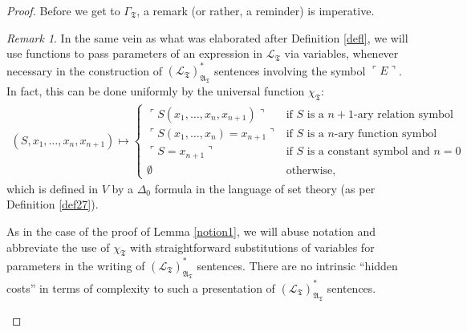\documentclass[12pt, twoside]{memoir}
\numberwithin{equation}{section}
\theoremstyle{definition}
\theoremstyle{remark}
\newtheorem{rem}[thm]{Remark}
\theoremstyle{definition}
\theoremstyle{definition}
\theoremstyle{definition}
\theoremstyle{remark}
\begin{document}
\begin{proof}
Before we get to $\Gamma_{\mathfrak{T}}$, a remark (or rather, a reminder) is imperative.

\begin{rem}\label{subsafe2}
In the same vein as what was elaborated after Definition \ref{defl}, we will use functions to pass parameters of an expression in $\mathcal{L}_{\mathfrak{T}}$ via variables, whenever necessary in the construction of $({\mathcal{L}_{\mathfrak{T}}})^*_{\mathfrak{A}_{\mathfrak{T}}}$ sentences involving the symbol $\ulcorner E \urcorner$. In fact, this can be done uniformly by the universal function $\chi_{\mathfrak{T}}$: 
\begin{align*}
    (S, x_1, \dots, x_n, x_{n+1}) \mapsto 
    \begin{cases}
        \ulcorner S(x_1, \dots, x_n, x_{n+1}) \urcorner & \text{if } S \text{ is a } n+1 \text{-ary relation symbol} \\
        \ulcorner S(x_1, \dots, x_n) = x_{n+1} \urcorner & \text{if } S \text{ is a } n \text{-ary function symbol }\\
        \ulcorner S = x_{n+1} \urcorner & \text{if } S \text{ is a } \text{constant symbol and } n = 0 \\
        \emptyset & \text{otherwise},
    \end{cases}
\end{align*}
which is defined in $V$ by a $\Delta_0$ formula in the language of set theory (as per Definition \ref{def27}).

As in the case of the proof of Lemma \ref{notion1}, we will abuse notation and abbreviate the use of $\chi_{\mathfrak{T}}$ with straightforward substitutions of variables for parameters in the writing of $({\mathcal{L}_{\mathfrak{T}}})^*_{\mathfrak{A}_{\mathfrak{T}}}$ sentences. There are no intrinsic ``hidden costs'' in terms of complexity to such a presentation of $({\mathcal{L}_{\mathfrak{T}}})^*_{\mathfrak{A}_{\mathfrak{T}}}$ sentences.
\end{rem}


\end{proof}
\end{document}

